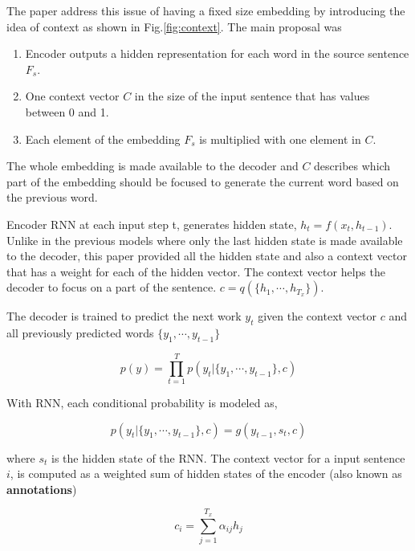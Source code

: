 \documentclass[a4paper]{article}
\begin{document}
The paper  \cite{bahdanau2014neural} address this issue  of having a  fixed size
embedding by introducing the idea of context  as shown in Fig.\ref{fig:context}.
The main proposal was


\begin{enumerate}
  \item Encoder  outputs a  hidden  representation  for  each word in the source
        sentence $F_s$.
  \item One context vector $C$ in the size of the input sentence that has values
        between 0 and 1.
  \item Each element of the embedding  $F_s$  is multiplied with one  element in
        $C$.
\end{enumerate}


The whole embedding is  made available to  the decoder  and $C$  describes which
part of  the embedding should be focused to generate  the current word based  on
the previous word.

Encoder  RNN  at  each  input  step t, generates hidden  state,  $h_t  =  f(x_t,
h_{t-1})$.  Unlike  in the previous models where  only the last hidden state  is
made available to the decoder, this paper provided all the hidden state and also
a  context vector that has a weight for each of the  hidden vector. The  context
vector  helps   the  decoder  to  focus  on  a  part  of  the  sentence.  $c   =
q(\{h_1,\cdots,h_{T_x}\})$.


The decoder is trained to predict the next work $y_t$  given the context  vector
$c$ and all previously predicted words $\{ y_1, \cdots, y_{t-1}\}$


\begin{equation*}
  p(y) = \prod^{T}_{t=1} p(y_t | \{ y_1, \cdots, y_{t-1}\}, c)
\end{equation*}


With RNN, each conditional probability is modeled as,


\begin{equation*}
  p(y_t | \{ y_1, \cdots, y_{t-1}\}, c) = g(y_{t-1}, s_t, c)
\end{equation*}


where  $s_t$ is the hidden  state  of  the RNN. The context vector  for a  input
sentence $i$, is  computed  as  a weighted  sum of  hidden states of the encoder
(also known as \textbf{annotations})


\begin{equation*}
  c_i = \sum_{j=1}^{T_{x}} \alpha_{ij} h_j
\end{equation*}
\end{document}
